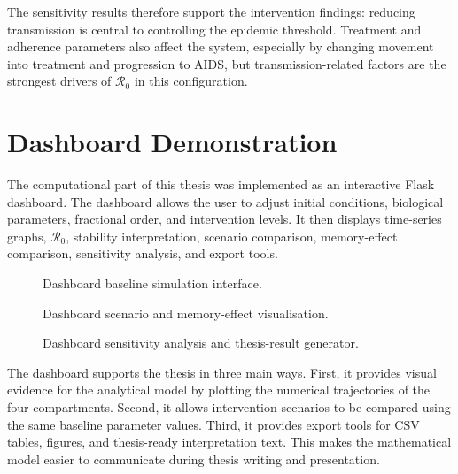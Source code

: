\documentclass[12pt,a4paper,oneside]{report}
\begin{document}
The sensitivity results therefore support the intervention findings: reducing transmission is central to controlling the epidemic threshold. Treatment and adherence parameters also affect the system, especially by changing movement into treatment and progression to AIDS, but transmission-related factors are the strongest drivers of $\mathcal{R}_0$ in this configuration.

\section{Dashboard Demonstration}
The computational part of this thesis was implemented as an interactive Flask dashboard. The dashboard allows the user to adjust initial conditions, biological parameters, fractional order, and intervention levels. It then displays time-series graphs, $\mathcal{R}_0$, stability interpretation, scenario comparison, memory-effect comparison, sensitivity analysis, and export tools.

\begin{figure}[H]
\centering
{}
\caption{Dashboard baseline simulation interface.}
\label{fig:dashboard_baseline}
\end{figure}

\begin{figure}[H]
\centering
{}
\caption{Dashboard scenario and memory-effect visualisation.}
\label{fig:dashboard_scenarios_memory}
\end{figure}

\begin{figure}[H]
\centering
{}
\caption{Dashboard sensitivity analysis and thesis-result generator.}
\label{fig:dashboard_sensitivity_chapter6}
\end{figure}

The dashboard supports the thesis in three main ways. First, it provides visual evidence for the analytical model by plotting the numerical trajectories of the four compartments. Second, it allows intervention scenarios to be compared using the same baseline parameter values. Third, it provides export tools for CSV tables, figures, and thesis-ready interpretation text. This makes the mathematical model easier to communicate during thesis writing and presentation.
\end{document}
